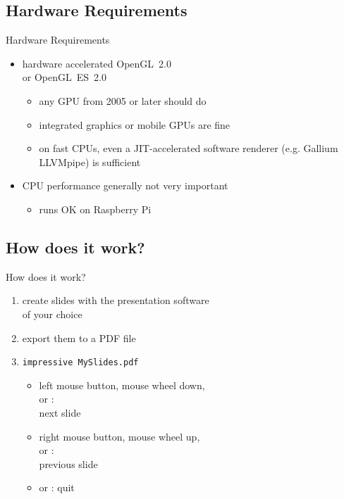 \documentclass[bigger,hyperref={colorlinks=true,linkcolor=white,urlcolor=blue}]{beamer}
\begin{document}
\subsection{Hardware Requirements}
\begin{frame}{Hardware Requirements}
    \begin{itemize}
        \item hardware accelerated OpenGL~2.0 \\ or OpenGL~ES~2.0
            \begin{itemize}
                \item any GPU from 2005 or later should do
                \item integrated graphics or mobile GPUs are fine
                \item on fast CPUs, even a JIT-accelerated software
                      renderer (e.g. Gallium LLVMpipe) is sufficient
            \end{itemize}
        \item CPU performance generally not very important
            \begin{itemize}
                \item runs OK on Raspberry Pi
            \end{itemize}
    \end{itemize}
\end{frame}

\subsection{How does it work?}
\begin{frame}{How does it work?}
    \begin{enumerate}
        \item create slides with the presentation software \\
              of your choice
        \item export them to a PDF file
        \item \texttt{impressive MySlides.pdf}
            \begin{itemize}
                \item left mouse button, mouse wheel down, \\
                      \PgDown or : \\
                      \hspace{1cm} next slide
                \item right mouse button, mouse wheel up, \\
                      \PgUp or : \\
                      \hspace{1cm} previous slide
                \item {} or \Esc: quit
            \end{itemize}
    \end{enumerate}
\end{frame}
\end{document}
